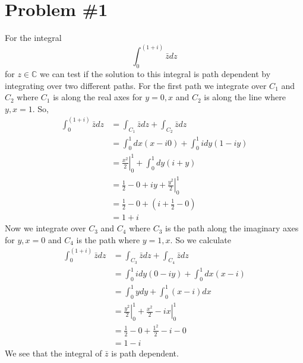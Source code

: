 \documentclass[11pt]{article}
\numberwithin{equation}{section}
\begin{document}


\section{Problem \#1}
For the integral 
$$\int_{0}^{(1+i)}\bar{z}dz$$
for $z\in\mathbb{C}$ we can test if the solution to this integral is path dependent by 
integrating over two different paths. For the first path we integrate over $C_1$ and $C_2$
where $C_1$ is along the real axes for $y=0, x$ and $C_2$ is along the line where $y,x=1$.
So,
\begin{align*}
\int_{0}^{(1+i)}\bar{z}dz &= \int_{C_1}\bar{z}dz + \int_{C_2}\bar{z}dz\\
&= \int_{0}^{1}dx(x-i0) + \int_{0}^{1}idy(1-iy)\\
&= \left.\frac{x^2}{2}\right|_0^1 + \int_{0}^{1}dy(i+y)\\
&= \frac{1}{2}-0 + \left.iy+\frac{y^2}{2}\right|_0^1\\
&= \frac{1}{2}-0 + (i+\frac{1}{2}-0)\\
&= 1+i
\end{align*}
Now we integrate over $C_3$ and $C_4$ where $C_3$ is the path along the imaginary axes for
$y,x=0$ and $C_4$ is the path where $y=1,x$. So we calculate
\begin{align*}
\int_{0}^{(1+i)}\bar{z}dz &= \int_{C_3}\bar{z}dz + \int_{C_4}\bar{z}dz\\
&= \int_0^1idy(0-iy) + \int_{0}^{1}dx(x-i)\\
&= \int_0^1ydy + \int_{0}^{1}(x-i)dx\\
&= \left.\frac{y^2}{2}\right|_0^1 + \left.\frac{x^2}{2}-ix\right|_{0}^{1}\\
&= \frac{1}{2}-0 + \frac{1^2}{2}-i-0\\
&= 1-i
\end{align*}
We see that the integral of $\bar{z}$ is path dependent.

\pagebreak
\end{document}
